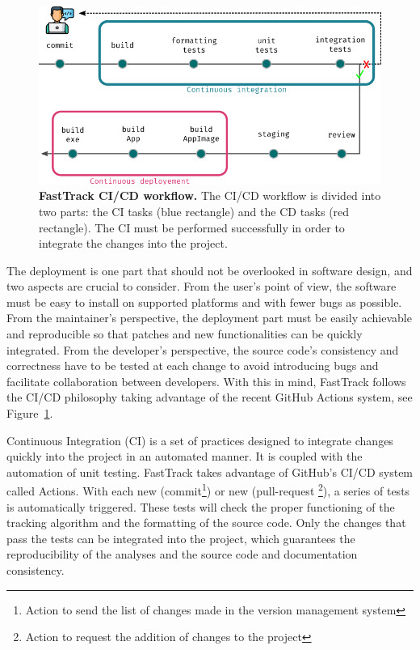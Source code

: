     \begin{figure}[h!]
    \centering
    \includegraphics[width=1\textwidth]{part_1/assets/Figure_cicd.png}
    \caption{{\bf FastTrack CI/CD workflow.} The CI/CD workflow is divided into two parts: the CI tasks (blue rectangle) and the CD tasks (red rectangle). The CI must be performed successfully in order to integrate the changes into the project.}
    \label{part_1:fig_cicd}
    \end{figure}

    The deployment is one part that should not be overlooked in software design, and two aspects are crucial to consider. From the user's point of view, the software must be easy to install on supported platforms and with fewer bugs as possible. From the maintainer's perspective, the deployment part must be easily achievable and reproducible so that patches and new functionalities can be quickly integrated. From the developer's perspective, the source code's consistency and correctness have to be tested at each change to avoid introducing bugs and facilitate collaboration between developers.  With this in mind, FastTrack follows the CI/CD philosophy \cite{shahin2017continuous}\cite{wikstrom2019benefits} taking advantage of the recent GitHub Actions system, see Figure~\ref{part_1:fig_cicd}.

    Continuous Integration (CI) is a set of practices designed to integrate changes quickly into the project in an automated manner. It is coupled with the automation of unit testing. FastTrack takes advantage of GitHub's CI/CD system called Actions. With each new (commit\footnote{Action to send the list of changes made in the version management system}) or new (pull-request \footnote{Action to request the addition of changes to the project}), a series of tests is automatically triggered. These tests will check the proper functioning of the tracking algorithm and the formatting of the source code. Only the changes that pass the tests can be integrated into the project, which guarantees the reproducibility of the analyses and the source code and documentation consistency.

